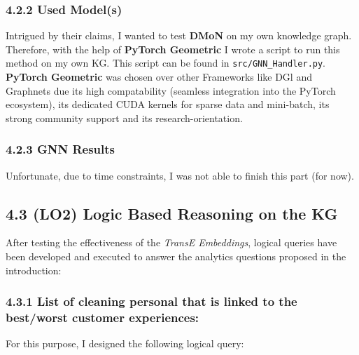 \documentclass[
]{article}
\begin{document}
\subsubsection{4.2.2 Used Model(s)}\label{used-models-1}

Intrigued by their claims, I wanted to test \textbf{DMoN} on my own
knowledge graph. Therefore, with the help of \textbf{PyTorch Geometric}
I wrote a script to run this method on my own KG. This script can be
found in \texttt{src/GNN\_Handler.py}. \\
 \textbf{PyTorch Geometric} was
chosen over other Frameworks like DGl and Graphnets due its high
compatability (seamless integration into the PyTorch ecosystem), its
dedicated CUDA kernels for sparse data and mini-batch, its strong
community support and its research-orientation.

\subsubsection{4.2.3 GNN Results}\label{gnn-results}

Unfortunate, due to time constraints, I was not able to finish this part
(for now).

\subsection{4.3 (LO2) Logic Based Reasoning on the
KG}\label{logic-based-reasoning-on-the-kg}

After testing the effectiveness of the \emph{TransE Embeddings}, logical
queries have been developed and executed to answer the analytics
questions proposed in the introduction:

\subsubsection{4.3.1 List of cleaning personal that is linked to the
best/worst customer
experiences:}\label{list-of-cleaning-personal-that-is-linked-to-the-bestworst-customer-experiences}

For this purpose, I designed the following logical query:

\vspace*{10mm}
\end{document}
